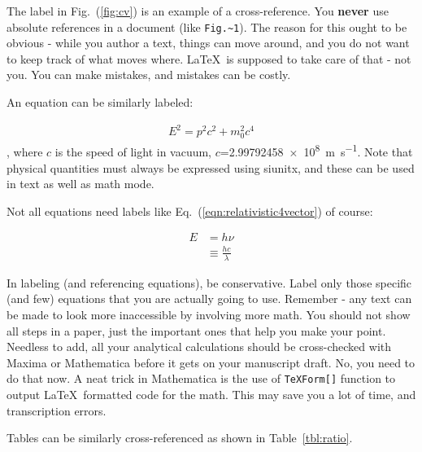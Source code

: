 \documentclass[12pt,twocolumn]{article}
\begin{document}
The label in Fig.~(\ref{fig:cv}) is an example of a cross-reference. You \textbf{never} use absolute references in a document (like \verb|Fig.~1|). The reason for this ought to be obvious - while you author a text, things can move around, and you do not want to keep track of what moves where. \LaTeX\ is supposed to take care of that - not you. You can make mistakes, and mistakes can be costly.

An equation can be similarly labeled:

\begin{align}
  E^{2} = p^{2} c^{2} + m_{0}^{2} c^{4} \label{eqn:relativistic4vector}
\end{align}
, where $c$ is the speed of light in vacuum, $c$=\qty{2.99792458e8}{\meter\per\second}. Note that physical quantities must always be expressed using siunitx, and these can be used in text as well as math mode.

Not all equations need labels like Eq.~(\ref{eqn:relativistic4vector}) of course:

\begin{align}
  E & = h\nu \nonumber \\
  & \equiv \frac{h c}{\lambda} \label{eqn:plancksrelationship}
\end{align}

In labeling (and referencing equations), be conservative. Label only those specific (and few) equations that you are actually going to use. Remember - any text can be made to look more inaccessible by involving more math. You should not show all steps in a paper, just the important ones that help you make your point. Needless to add, all your analytical calculations should be cross-checked with Maxima or Mathematica before it gets on your manuscript draft. No, you need to do that now. A neat trick in Mathematica is the use of \verb|TeXForm[]| function to output \LaTeX\ formatted code for the math. This may save you a lot of time, and transcription errors.

Tables can be similarly cross-referenced as shown in Table~\ref{tbl:ratio}.
\end{document}
